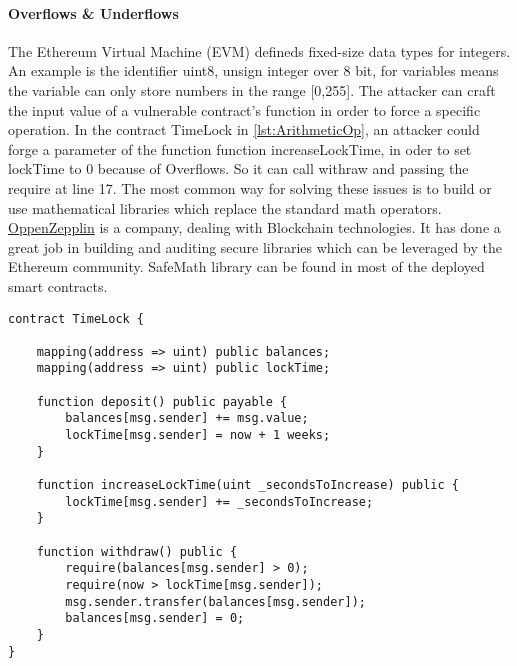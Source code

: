 \documentclass[a4paper,sigconf, language=french,
language=german, language=spanish, language=english]{acmart}
\begin{document}
\paragraph{Overflows \& Underflows} The Ethereum Virtual Machine (EVM) defineds fixed-size data types for integers. 
An example is the identifier uint8, unsign integer over 8 bit, for variables means the variable can only store numbers in the range [0,255].
The attacker can craft the input value of a vulnerable contract's function in order to force a specific operation. 
In the contract TimeLock in \autoref{lst:ArithmeticOp}, an attacker could forge a parameter of the function function increaseLockTime, 
in oder to set lockTime to 0 because of Overflows. So it can call withraw and passing the require at line 17.
The most common way for solving these issues is to build or use mathematical libraries which replace the standard math operators. 
\href{https://www.openzeppelin.com/}{OppenZepplin} is a company, dealing with Blockchain technologies. It has done a great job in building and auditing secure libraries which can be leveraged by the Ethereum community.
SafeMath library can be found in most of the deployed smart contracts.
\begin{lstlisting}[language=Solidity,caption={Overflows \& Underflows},label={lst:ArithmeticOp}]
contract TimeLock {
  
    mapping(address => uint) public balances;
    mapping(address => uint) public lockTime;
    
    function deposit() public payable {
        balances[msg.sender] += msg.value;
        lockTime[msg.sender] = now + 1 weeks;
    }
    
    function increaseLockTime(uint _secondsToIncrease) public {
        lockTime[msg.sender] += _secondsToIncrease;
    }
    
    function withdraw() public {
        require(balances[msg.sender] > 0);
        require(now > lockTime[msg.sender]);
        msg.sender.transfer(balances[msg.sender]);
        balances[msg.sender] = 0;
    }
}
\end{lstlisting}
\end{document}

